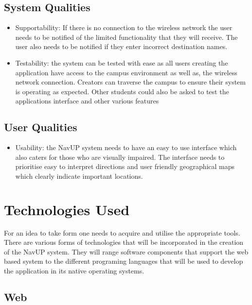 \documentclass[11pt]{article}
\begin{document}
\subsection{System Qualities}

\begin{itemize}

\item Supportability: If there is no connection to the wireless network the user needs to be notified of the limited functionality that they will receive. The user also needs to be notified if they enter incorrect destination names. 	
\item Testability: the system can be tested with ease as all users creating the application have access to the campus environment as well as, the wireless network connection. Creators can traverse the campus to ensure their system is operating as expected. Other students could also be asked to test the applications interface and other various features  

\end{itemize}

\subsection{User Qualities}

\begin{itemize}

\item Usability: the NavUP system needs to have an easy to use interface which also caters for those who are visually impaired. The interface needs to prioritise easy to interpret directions and user friendly geographical maps which clearly indicate important locations.  	

\end{itemize}

\section{Technologies Used}
For an idea to take form one needs to acquire and utilise the appropriate tools. There are various forms of technologies that will be incorporated in the creation of the NavUP system. They will range software components that support the web based system to the different programing languages that will be used to develop the application in its native operating systems. 

\subsection{Web}
\end{document}
